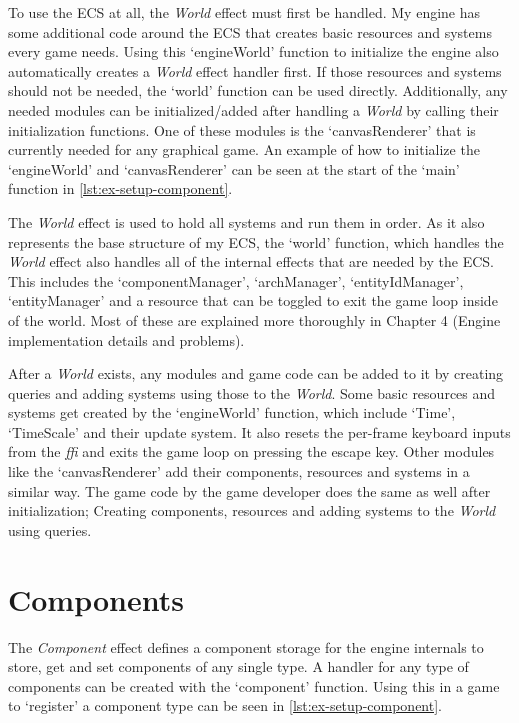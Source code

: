 To use the ECS at all, the \textit{World} effect must first be handled. My engine has some additional code around the ECS that creates basic resources and systems every game needs. Using this `engineWorld' function to initialize the engine also automatically creates a \textit{World} effect handler first. If those resources and systems should not be needed, the `world' function can be used directly. Additionally, any needed modules can be initialized/added after handling a \textit{World} by calling their initialization functions. One of these modules is the `canvasRenderer' that is currently needed for any graphical game. An example of how to initialize the `engineWorld' and `canvasRenderer' can be seen at the start of the `main' function in \cref{lst:ex-setup-component}.

The \textit{World} effect is used to hold all systems and run them in order. As it also represents the base structure of my ECS, the `world' function, which handles the \textit{World} effect also handles all of the internal effects that are needed by the ECS. This includes the `componentManager', `archManager', `entityIdManager', `entityManager' and a resource that can be toggled to exit the game loop inside of the world. Most of these are explained more thoroughly in Chapter 4 (Engine implementation details and problems).

After a \textit{World} exists, any modules and game code can be added to it by creating queries and adding systems using those to the \textit{World}. Some basic resources and systems get created by the `engineWorld' function, which include `Time', `TimeScale' and their update system. It also resets the per-frame keyboard inputs from the \textit{ffi} and exits the game loop on pressing the escape key. Other modules like the `canvasRenderer' add their components, resources and systems in a similar way. The game code by the game developer does the same as well after initialization; Creating components, resources and adding systems to the \textit{World} using queries.

\section{Components}

The \textit{Component} effect defines a component storage for the engine internals to store, get and set components of any single type. A handler for any type of components can be created with the `component' function. Using this in a game to `register' a component type can be seen in \cref{lst:ex-setup-component}.

